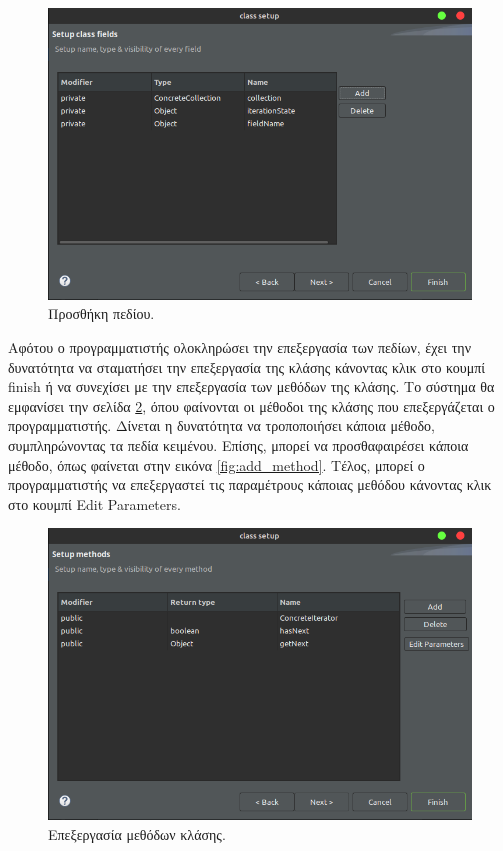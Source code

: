 \begin{figure}[H]
    \centering
    \includegraphics[width=1.0\textwidth]{Figures/add_field.png}
    \caption{Προσθήκη πεδίου.}
    \label{fig:add_field}
\end{figure}
Αφότου ο προγραμματιστής ολοκληρώσει την επεξεργασία των πεδίων, 
έχει την δυνατότητα να σταματήσει την επεξεργασία της κλάσης κάνοντας κλικ στο κουμπί finish 
ή να συνεχίσει με την επεξεργασία των μεθόδων της κλάσης. Το σύστημα θα εμφανίσει την σελίδα \ref{fig:edit_class_methods}, 
όπου φαίνονται οι μέθοδοι της κλάσης που επεξεργάζεται ο προγραμματιστής. Δίνεται η δυνατότητα να τροποποιήσει κάποια μέθοδο, 
συμπληρώνοντας τα πεδία κειμένου. Επίσης, μπορεί να προσθαφαιρέσει κάποια μέθοδο, όπως φαίνεται στην εικόνα \ref{fig:add_method}.
Τέλος, μπορεί ο προγραμματιστής να επεξεργαστεί τις παραμέτρους κάποιας μεθόδου κάνοντας κλικ στο κουμπί Edit Parameters.
\begin{figure}[H]
    \centering
    \includegraphics[width=1.0\textwidth]{Figures/edit_class_methods.png}
    \caption{Επεξεργασία μεθόδων κλάσης.}
    \label{fig:edit_class_methods}
\end{figure}
